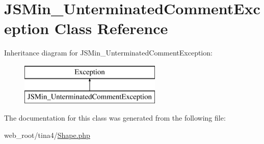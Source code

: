 \hypertarget{classJSMin__UnterminatedCommentException}{}\section{J\+S\+Min\+\_\+\+Unterminated\+Comment\+Exception Class Reference}
\label{classJSMin__UnterminatedCommentException}
Inheritance diagram for J\+S\+Min\+\_\+\+Unterminated\+Comment\+Exception\+:\begin{figure}[H]
\begin{center}
\leavevmode
\includegraphics[height=2.000000cm]{classJSMin__UnterminatedCommentException}
\end{center}
\end{figure}


The documentation for this class was generated from the following file\+:\begin{DoxyCompactItemize}
\item 
web\+\_\+root/tina4/\hyperlink{Shape_8php}{Shape.\+php}\end{DoxyCompactItemize}
